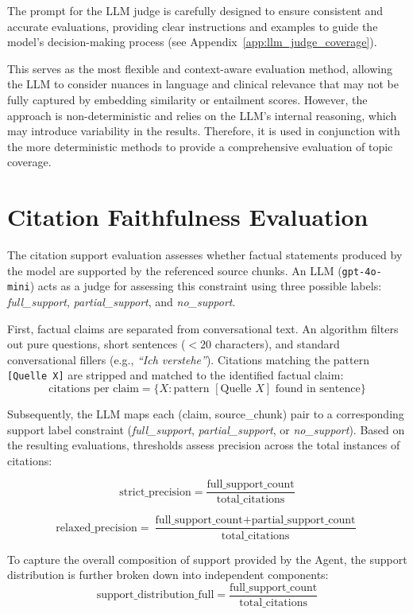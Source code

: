 The prompt for the LLM judge is carefully designed to ensure consistent and accurate evaluations, providing clear instructions and examples to guide the model's decision-making process (see Appendix~\ref{app:llm_judge_coverage}).

This serves as the most flexible and context-aware evaluation method, allowing the LLM to consider nuances in language and clinical relevance that may not be fully captured by embedding similarity or entailment scores.
However, the approach is non-deterministic and relies on the LLM's internal reasoning, which may introduce variability in the results. 
Therefore, it is used in conjunction with the more deterministic methods to provide a comprehensive evaluation of topic coverage.

\section{Citation Faithfulness Evaluation}

The citation support evaluation assesses whether factual statements produced by the model are supported by the referenced source chunks. 
An LLM (\texttt{gpt-4o-mini}) acts as a judge for assessing this constraint using three possible labels: \textit{full\_support}, \textit{partial\_support}, and \textit{no\_support}.

First, factual claims are separated from conversational text. An algorithm filters out pure questions, short sentences ($< 20$ characters), and standard conversational fillers (e.g., \textit{``Ich verstehe''}). 
Citations matching the pattern \texttt{[Quelle X]} are stripped and matched to the identified factual claim:
\[
\text{citations per claim} = \{ X : \text{pattern } [\text{Quelle } X] \text{ found in sentence}\}
\]

Subsequently, the LLM maps each (claim, source\_chunk) pair to a corresponding support label constraint (\textit{full\_support}, \textit{partial\_support}, or \textit{no\_support}). 
Based on the resulting evaluations, thresholds assess precision across the total instances of citations:

\[
\text{strict\_precision} = \frac{\text{full\_support\_count}}{\text{total\_citations}}
\]

\[
\text{relaxed\_precision} = \frac{\text{full\_support\_count} + \text{partial\_support\_count}}{\text{total\_citations}}
\]

To capture the overall composition of support provided by the Agent, the support distribution is further broken down into independent components:
\[
\text{support\_distribution\_full} = \frac{\text{full\_support\_count}}{\text{total\_citations}}
\]

